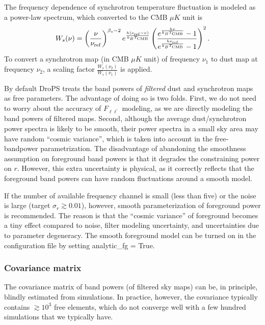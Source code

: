 \documentclass[12pt, a4paper]{ctexart} %
\begin{document}
The frequency dependence of synchrotron temperature fluctuation is modeled as a power-law spectrum, which converted to the CMB $\mu K$ unit is
\begin{equation}
  W_s(\nu) = \left(\frac{\nu}{\nu_{\rm ref}}\right)^{\beta_s-2}e^{\frac{h(\nu_{\rm ref} - \nu)}{k_BT_{\rm CMB}}}\left(\frac{e^{\frac{h\nu}{k_BT_{\rm CMB}}}-1}{e^{\frac{h\nu_{\rm ref}}{k_BT_{\rm CMB}}}-1}\right)^2. \label{eq:sync_w}
\end{equation}
To convert a synchrotron map (in CMB $\mu K$ unit) of frequency $\nu_1$ to dust map at frequency $\nu_2$, a scaling factor $\frac{W_s(\nu_2)}{W_s(\nu_1)}$ is applied.

By default DroPS treats the band powers of {\it filtered} dust and synchrotron maps as free parameters. The advantage of doing so is two folds. First, we do not need to worry about the accuracy of $F_{\ell\ell^\prime}$ modeling, as we are directly modeling the band powers of filtered maps. Second, although the average dust/synchrotron power spectra is likely to be smooth, their power spectra in a small sky area may have random ``cosmic variance'', which is taken into account in the free-bandpower parametrization. The disadvantage of abandoning the smoothness assumption on foreground band powers is that it degrades the constraining power on $r$. However, this extra uncertainty is physical, as it correctly reflects that the foreground band powers can have random fluctuations around a smooth model.

If the number of available frequency channel is small (less than five) or the noise is large (target $\sigma_r\gtrsim 0.01$), however, smooth parameterization of foreground power is recommended. The reason is that the ``cosmic variance'' of foreground becomes a tiny effect compared to noise, filter modeling uncertainty, and uncertainties due to parameter degeneracy. The smooth foreground model can be turned on in the configuration file by setting analytic\_fg = True.

\subsubsection{Covariance matrix}

The covariance matrix of band powers (of filtered sky maps) can be, in principle, blindly estimated from simulations. In practice, however, the covariance typically contains $\gtrsim 10^3$ free elements, which do not converge well with a few hundred simulations that we typically have.
\end{document}
